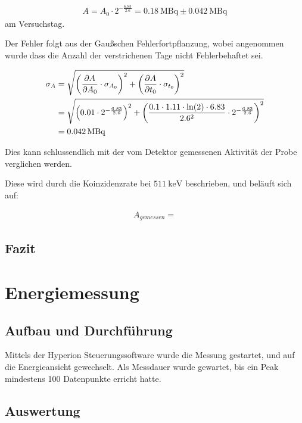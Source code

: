 \documentclass[12pt,twoside,a4paper]{scrartcl}
\begin{document}
			\begin{align*}
				A = A_0 \cdot 2^{- \frac{6.83}{2.6}} = \SI{0.18}{\mega \becquerel} \pm \SI{0.042}{\mega \becquerel}
			\end{align*}
			am Versuchstag.

			Der Fehler folgt aus der Gaußschen Fehlerfortpflanzung, wobei angenommen wurde dass die Anzahl der verstrichenen Tage nicht Fehlerbehaftet sei.

			\begin{align*}
				\sigma_A &= \sqrt{\qty(\pdv{A}{A_0} \cdot \sigma_{A_0})^2 + \qty(\pdv{A}{t_0} \cdot \sigma_{t_0})^2} \\
								 &= \sqrt{\qty(0.01 \cdot 2^{-\frac{6.83}{2.6}})^2 + \qty(\frac{0.1 \cdot 1.11 \cdot \ln(2) \cdot 6.83}{2.6^2} \cdot 2^{-\frac{6.83}{2.6}})^2} \\
								 &= \SI{0.042}{\mega \becquerel}
			\end{align*}

			Dies kann schlussendlich mit der vom Detektor gemessenen Aktivität der Probe verglichen werden.

			Diese wird durch die Koinzidenzrate bei $\SI{511}{\kilo \electronvolt}$ beschrieben, und beläuft sich auf:

			\begin{align*}
				A_{gemessen} =
			\end{align*}

		\subsection{Fazit}



	\section{Energiemessung}

	\subsection{Aufbau und Durchführung}
		Mittels der Hyperion Steuerungssoftware wurde die Messung gestartet, und auf die Energieansicht gewechselt. Als Messdauer wurde gewartet, bis ein Peak mindestens 100 Datenpunkte erricht hatte.


	\subsection{Auswertung}
\end{document}
